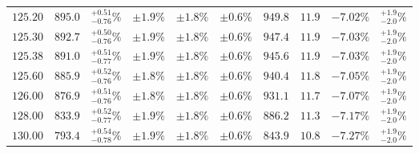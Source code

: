 \begin{table}[ht!]
{{\begin{tabular}{| cc | c | ccc | ccc | c |}
$125.20$ & $895.0$ & $^{+0.51}_{-0.76}\%$ & $\pm 1.9\%$ & {\color{black!55}$\pm 1.8\%$} & {\color{black!55}$\pm 0.6\%$} & $949.8$ & $11.9$ & $-7.02\%$ & $^{+1.9}_{-2.0}\%$ \\
$125.30$ & $892.7$ & $^{+0.50}_{-0.76}\%$ & $\pm 1.9\%$ & {\color{black!55}$\pm 1.8\%$} & {\color{black!55}$\pm 0.6\%$} & $947.4$ & $11.9$ & $-7.03\%$ & $^{+1.9}_{-2.0}\%$ \\
$125.38$ & $891.0$ & $^{+0.51}_{-0.77}\%$ & $\pm 1.9\%$ & {\color{black!55}$\pm 1.8\%$} & {\color{black!55}$\pm 0.6\%$} & $945.6$ & $11.9$ & $-7.03\%$ & $^{+1.9}_{-2.0}\%$ \\
$125.60$ & $885.9$ & $^{+0.52}_{-0.76}\%$ & $\pm 1.8\%$ & {\color{black!55}$\pm 1.8\%$} & {\color{black!55}$\pm 0.6\%$} & $940.4$ & $11.8$ & $-7.05\%$ & $^{+1.9}_{-2.0}\%$ \\
$126.00$ & $876.9$ & $^{+0.51}_{-0.76}\%$ & $\pm 1.8\%$ & {\color{black!55}$\pm 1.8\%$} & {\color{black!55}$\pm 0.6\%$} & $931.1$ & $11.7$ & $-7.07\%$ & $^{+1.9}_{-2.0}\%$ \\
$128.00$ & $833.9$ & $^{+0.52}_{-0.77}\%$ & $\pm 1.9\%$ & {\color{black!55}$\pm 1.8\%$} & {\color{black!55}$\pm 0.6\%$} & $886.2$ & $11.3$ & $-7.17\%$ & $^{+1.9}_{-2.0}\%$ \\
$130.00$ & $793.4$ & $^{+0.54}_{-0.78}\%$ & $\pm 1.9\%$ & {\color{black!55}$\pm 1.8\%$} & {\color{black!55}$\pm 0.6\%$} & $843.9$ & $10.8$ & $-7.27\%$ & $^{+1.9}_{-2.0}\%$ \\
\cline{1-10}
\end{tabular}
}
}
\end{table}


